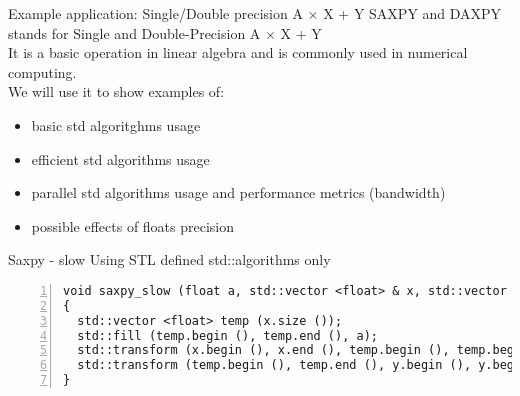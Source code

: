 \documentclass[10pt,aspectratio=169]{beamer}
\begin{document}
\begin{frame}{Example application: Single/Double precision A $\times$ X + Y}
SAXPY and DAXPY stands for Single and Double-Precision A $\times$ X + Y\\
It is a basic operation in linear algebra and is commonly used in numerical computing.\\
We will use it to show examples of:
\begin{itemize}
    \item basic std algoritghms usage
    \item efficient std algorithms usage
    \item parallel std algorithms usage and performance metrics (bandwidth)
    \item possible effects of floats precision
\end{itemize}
\end{frame}


\begin{frame}[fragile]{Saxpy - slow}
Using STL defined std::algorithms only
\begin{lstlisting}[frame=single, style=cpp, firstnumber=1, numbers=left, numberstyle=\tiny,showtabs=false,xleftmargin=.05\linewidth,xrightmargin=.025\linewidth]
void saxpy_slow (float a, std::vector <float> & x, std::vector <float> & y)
{
  std::vector <float> temp (x.size ());
  std::fill (temp.begin (), temp.end (), a);
  std::transform (x.begin (), x.end (), temp.begin (), temp.begin (), std::multiplies <float> ());
  std::transform (temp.begin (), temp.end (), y.begin (), y.begin (), thrust::plus <float> ());
}
\end{lstlisting}

\end{frame}
\end{document}
